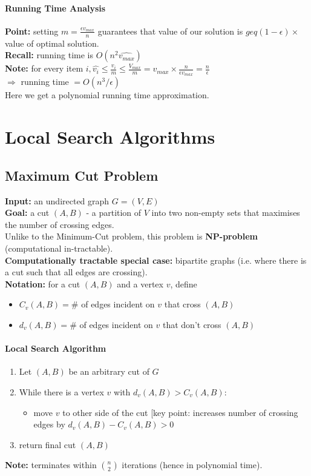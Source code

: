 \documentclass{scrartcl}
\begin{document}
\paragraph{Running Time Analysis}

{\bf Point: } setting $m = \frac{\epsilon v_{max}}n$ guarantees that value of
our solution is $geq (1-\epsilon) \times $ value of optimal solution.\\
{\bf Recall:} running time is $O(n^2 \hat{v_{max}})$\\
{\bf Note:} for every item $i, \hat{v_i} \leq \frac{v_i}m \leq \frac {V_{max}}m
= v_{max} \times \frac{n}{\epsilon v_{max}} = \frac n \epsilon $\\
$\Rightarrow$ running time $= O(n^3/\epsilon)$\\
Here we get a polynomial running time approximation.

\section{Local Search Algorithms}
\label{sec:19-0}
\subsection{Maximum Cut Problem}
\label{sec:19-1}
{\bf Input: } an undirected graph $G = (V, E)$\\
{\bf Goal: } a cut $(A, B)$ - a partition of $V$ into two non-empty sets that
maximises the number of crossing edges.\\
Unlike to the Minimum-Cut problem, this problem is {\bf NP-problem}
(computational in-tractable).\\
{\bf Computationally tractable special case: } bipartite graphs (i.e. where
there is a cut such that all edges are crossing). \\
{\bf Notation: } for a cut $(A, B)$ and a vertex $v$, define 
\begin{itemize}
\item $C_v(A, B) = \#$ of edges incident on $v$ that cross $(A, B)$
\item $d_v(A, B) = \#$ of edges incident on $v$ that don't cross $(A, B)$
\end{itemize}

\paragraph{Local Search Algorithm}
\begin{enumerate}
\item Let $(A, B)$ be an arbitrary cut of $G$
\item While there is a vertex $v$ with $d_v(A, B) > C_v(A, B)$:
  \begin{itemize}
  \item move $v$ to other side of the cut [key point: increases number of
    crossing edges by $d_v(A, B) - C_v(A, B) > 0$
  \end{itemize}
\item return final cut $(A, B)$
\end{enumerate}
{\bf Note: } terminates within $\binom{n}2$ iterations (hence in polynomial
time). 
\end{document}
